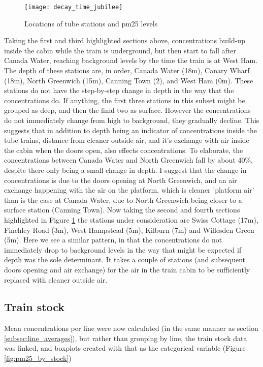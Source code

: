 \begin{figure}[H]
\centering
\texttt{[image: decay\_time\_jubilee]}
\caption{Locations of tube stations and \gls{pm25} levels}
\label{fig:decay_time_jubilee}
\end{figure}

Taking the first and third highlighted sections above, concentrations build-up inside the cabin while the train is underground, but then start to fall after Canada Water, reaching background levels by the time the train is at West Ham. The depth of these stations are, in order, Canada Water (18m), Canary Wharf (18m), North Greenwich (15m), Canning Town (2), and West Ham (0m). These stations do not have the step-by-step change in depth in the way that the concentrations do. If anything, the first three stations in this subset might be grouped as deep, and then the final two as surface. However the concentrations do not immediately change from high to background, they gradually decline. This suggests that in addition to depth being an indicator of concentrations inside the tube trains, distance from cleaner outside air, and it's exchange with air inside the cabin when the doors open, also effects concentrations. To elaborate, the concentrations between Canada Water and North Greenwich fall by about 40\%, despite there only being a small change in depth. I suggest that the change in concentrations is due to the doors opening at North Greenwich, and an air exchange happening with the air on the platform, which is cleaner 'platform air' than is the case at Canada Water, due to North Greenwich being closer to a surface station (Canning Town). 
Now taking the second and fourth sections highlighted in Figure \ref{fig:decay_time_jubilee} the stations under consideration are Swiss Cottage (17m), Finchley Road (3m), West Hampstead (5m), Kilburn (7m) and Willesden Green (5m). Here we see a similar pattern, in that the concentrations do not immediately drop to background levels in the way that might be expected if depth was the sole determinant. It takes a couple of stations (and subsequent doors opening and air exchange) for the air in the train cabin to be sufficiently replaced with cleaner outside air.

\subsection{Train stock}
\label{subsec:tube_train_stock}
Mean concentrations per line were now calculated (in the same manner as section \ref{subsec:line_averages}), but rather than grouping by line, the train stock data was linked, and boxplots created with that as the categorical variable (Figure \ref{fig:pm25_by_stock}) 

